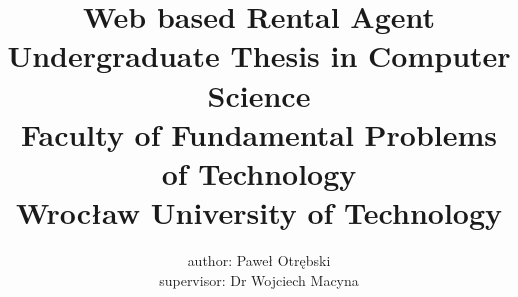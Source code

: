 \documentclass[10pt,a4paper]{report}
\begin{document}
\begin{titlepage}
\title{Web based Rental Agent\\
	\small{
	Undergraduate Thesis in Computer Science\\
	Faculty of Fundamental Problems of Technology\\
	Wrocław University of Technology}}
\date{}
\author{author: Paweł Otrębski \\ supervisor: Dr Wojciech Macyna}
\end{titlepage}
\maketitle
\tableofcontents
\newpage



\end{document}
